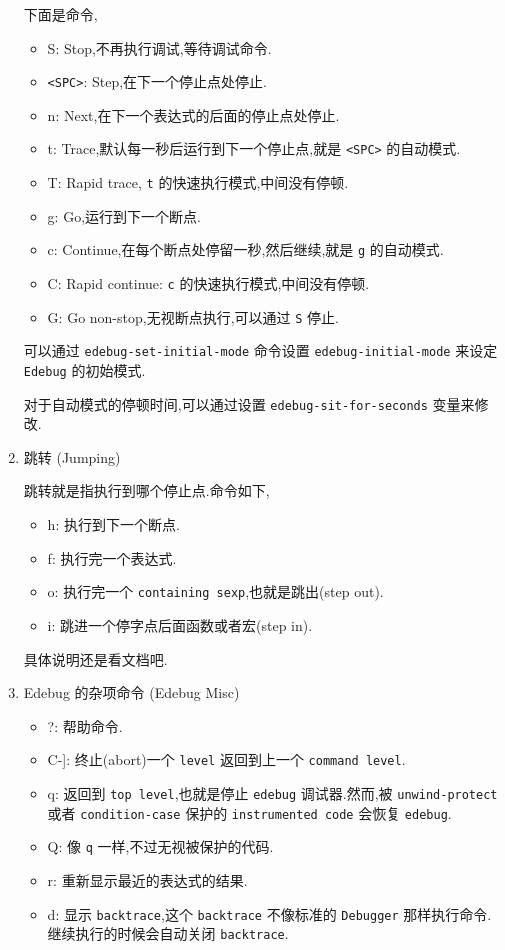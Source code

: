 \documentclass[11pt]{article}
\begin{document}
\begin{enumerate}
下面是命令,

\begin{itemize}
\item S: Stop,不再执行调试,等待调试命令.
\item \texttt{<SPC>}: Step,在下一个停止点处停止.
\item n: Next,在下一个表达式的后面的停止点处停止.
\item t: Trace,默认每一秒后运行到下一个停止点,就是 \texttt{<SPC>} 的自动模式.
\item T: Rapid trace, \texttt{t} 的快速执行模式,中间没有停顿.
\item g: Go,运行到下一个断点.
\item c: Continue,在每个断点处停留一秒,然后继续,就是 \texttt{g} 的自动模式.
\item C: Rapid continue: \texttt{c} 的快速执行模式,中间没有停顿.
\item G: Go non-stop,无视断点执行,可以通过 \texttt{S} 停止.
\end{itemize}

可以通过 \texttt{edebug-set-initial-mode} 命令设置 \texttt{edebug-initial-mode} 来设定 \texttt{Edebug} 的初始模式.

对于自动模式的停顿时间,可以通过设置 \texttt{edebug-sit-for-seconds} 变量来修改.


\item 跳转 (Jumping)
\label{sec:org54b4956}

跳转就是指执行到哪个停止点.命令如下,

\begin{itemize}
\item h: 执行到下一个断点.
\item f: 执行完一个表达式.
\item o: 执行完一个 \texttt{containing sexp},也就是跳出(step out).
\item i: 跳进一个停字点后面函数或者宏(step in).
\end{itemize}

具体说明还是看文档吧.


\item Edebug 的杂项命令 (Edebug Misc)
\label{sec:org5475ff9}

\begin{itemize}
\item ?: 帮助命令.
\item C-]: 终止(abort)一个 \texttt{level} 返回到上一个 \texttt{command level}.
\item q: 返回到 \texttt{top level},也就是停止 \texttt{edebug} 调试器.然而,被 \texttt{unwind-protect} 或者 \texttt{condition-case} 保护的 \texttt{instrumented code} 会恢复 \texttt{edebug}.
\item Q: 像 \texttt{q} 一样,不过无视被保护的代码.
\item r: 重新显示最近的表达式的结果.
\item d: 显示 \texttt{backtrace},这个 \texttt{backtrace} 不像标准的 \texttt{Debugger} 那样执行命令.继续执行的时候会自动关闭 \texttt{backtrace}.
\end{itemize}



\end{enumerate}
\end{document}
